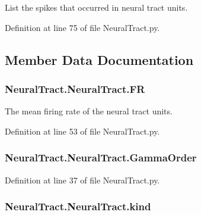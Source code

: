 List the spikes that occurred in neural tract units. 



Definition at line 75 of file Neural\+Tract.\+py.



\subsection{Member Data Documentation}
\subsubsection[{\texorpdfstring{FR}{FR}}]{\setlength{\rightskip}{0pt plus 5cm}Neural\+Tract.\+Neural\+Tract.\+FR}\hypertarget{class_neural_tract_1_1_neural_tract_aefbec14cba88a937841314d47f6056c0}{}\label{class_neural_tract_1_1_neural_tract_aefbec14cba88a937841314d47f6056c0}


The mean firing rate of the neural tract units. 



Definition at line 53 of file Neural\+Tract.\+py.

\subsubsection[{\texorpdfstring{Gamma\+Order}{GammaOrder}}]{\setlength{\rightskip}{0pt plus 5cm}Neural\+Tract.\+Neural\+Tract.\+Gamma\+Order}\hypertarget{class_neural_tract_1_1_neural_tract_aba5eca22ebc757b1ea009e97c1bd6e36}{}\label{class_neural_tract_1_1_neural_tract_aba5eca22ebc757b1ea009e97c1bd6e36}


Definition at line 37 of file Neural\+Tract.\+py.

\subsubsection[{\texorpdfstring{kind}{kind}}]{\setlength{\rightskip}{0pt plus 5cm}Neural\+Tract.\+Neural\+Tract.\+kind}\hypertarget{class_neural_tract_1_1_neural_tract_af52b112c86e0c774fa204b7e2154b6aa}{}\label{class_neural_tract_1_1_neural_tract_af52b112c86e0c774fa204b7e2154b6aa}



